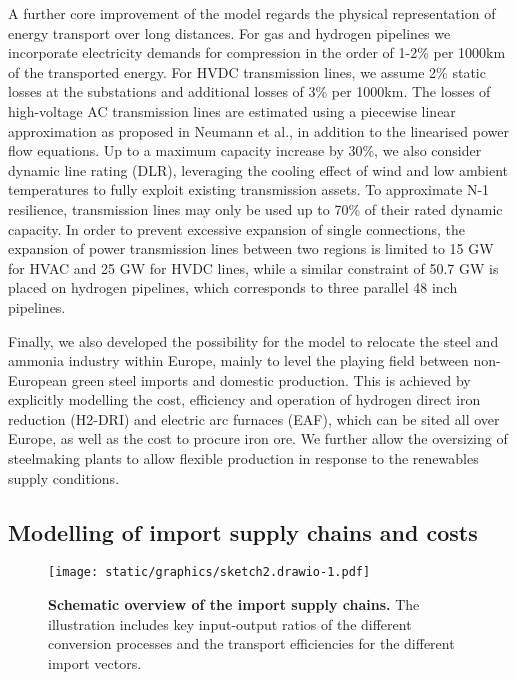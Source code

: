 A further core improvement of the model regards the physical representation of
energy transport over long distances. For gas and hydrogen pipelines we
incorporate electricity demands for compression in the order of 1-2\% per 1000km
of the transported energy.\cite{gasforclimateEuropeanHydrogen2021} For HVDC
transmission lines, we assume 2\% static losses at the substations and
additional losses of 3\% per 1000km. The losses of high-voltage AC transmission
lines are estimated using a piecewise linear approximation as proposed in
Neumann et al.,\cite{neumannAssessmentsLinear2022} in addition to the linearised
power flow equations.\cite{horschLinearOptimal2018} Up to a maximum capacity
increase by 30\%, we also consider dynamic line rating (DLR), leveraging the
cooling effect of wind and low ambient temperatures to fully exploit existing
transmission assets.\cite{glaumLeveragingExisting2023} To approximate N-1
resilience, transmission lines may only be used up to 70\% of their rated
dynamic capacity. In order to prevent excessive expansion of single connections,
the expansion of power transmission lines between two regions is limited to 15
GW for HVAC and 25 GW for HVDC lines, while a similar constraint of 50.7 GW is
placed on hydrogen pipelines, which corresponds to three parallel 48 inch
pipelines.\cite{gasforclimateEuropeanHydrogen2021}

Finally, we also developed the possibility for the model to relocate the steel
and ammonia industry within Europe, mainly to level the playing field between
non-European green steel imports and domestic production. This is achieved by
explicitly modelling the cost, efficiency and operation of hydrogen direct iron
reduction (H2-DRI) and electric arc furnaces (EAF), which can be sited all over
Europe, as well as the cost to procure iron ore. We further allow the oversizing
of steelmaking plants to allow flexible production in response to the renewables
supply conditions.

\subsection*{Modelling of import supply chains and costs}

\begin{figure*}
    \centering
    \texttt{[image: static/graphics/sketch2.drawio-1.pdf]}
    \caption{\textbf{Schematic overview of the import supply chains.} The
    illustration includes key input-output ratios of the different conversion
    processes and the transport efficiencies for the different import vectors.}
    \label{fig:import-esc-scheme}
\end{figure*}

